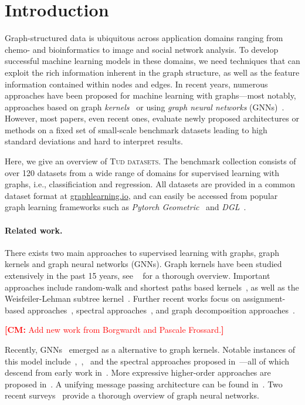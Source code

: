 \documentclass{article}
\theoremstyle{definition}
\newcommand{\new}[1]{\emph{#1}}
\newcommand{\cm}[1]{{{\textcolor{red}{\textbf{[CM:} {#1}\textbf{]}}}}}
\begin{document}
\section{Introduction}
Graph-structured data is ubiquitous across application domains ranging from chemo- and bioinformatics to image and social network analysis. To develop successful machine learning models in these domains, we need techniques that can exploit the rich information inherent in the graph structure, as well as the feature information contained within nodes and edges. In recent years, numerous approaches have been proposed for machine learning with graphs---most notably, approaches based on graph \new{kernels}~\cite{Kri+2019} or using \new{graph neural networks} (GNNs)~\cite{Gil+2017}. However, most papers, even recent ones, evaluate newly proposed architectures or methods on a fixed set of small-scale benchmark datasets leading to high standard deviations and hard to interpret results. 

Here, we give an overview of \textsc{Tud datasets}. The benchmark collection consists of over 120 datasets from a wide range of domains for supervised learning with graphs, i.e., classificiation and regression. All datasets are provided in a common dataset format at \url{graphlearning.io}, and can easily be accessed from popular graph learning frameworks such as \emph{Pytorch Geometric}~\cite{Fey+2019} and \emph{DGL}~\cite{Wan+2019}.

\paragraph{Related work.}
There exists two main approaches to supervised learning with graphs, graph kernels and graph neural networks (GNNs). Graph kernels have been studied extensively in the past 15 years, see ~\cite{Kri+2019} for a thorough overview. 
Important approaches include random-walk and shortest paths based kernels~\cite{Gaertner2003,Sugiyama2015,Bor+2005,Kri+2017b}, as well as the Weisfeiler-Lehman subtree kernel~\cite{She+2011,Mor+2017}. 
Further recent works focus on assignment-based approaches~\cite{Kri+2016,Nik+2017}, spectral approaches~\cite{Kon+2016}, and graph decomposition approaches~\cite{Nik+2018}.

\cm{Add new work from Borgwardt and Pascale Frossard.}

Recently, GNNs~\cite{Gil+2017} emerged as a alternative to graph kernels. Notable instances of this model include~\cite{Duv+2015},~\cite{Li+2016},~\cite{Ham+2017} and the spectral approaches proposed in~\cite{Bru+2014,Def+2015,Kip+2017}---all of which descend from early work in~\cite{Kir+1995,Mer+2005,Sca+2009}. More expressive higher-order approaches are proposed in~\cite{Mor+2019,Mar+2019}. A unifying message passing architecture can be found in~\cite{Gil+2017}. Two recent surveys~\cite{wu2019comprehensive,zhou2018graph} provide a thorough overview of graph neural networks.
\end{document}
